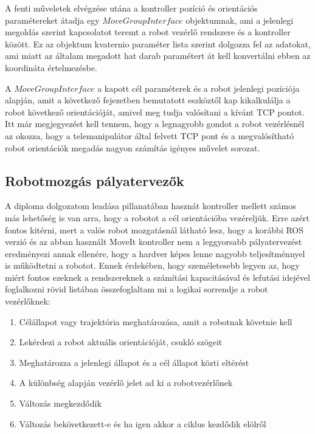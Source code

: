 A fenti műveletek elvégzése utána a kontroller pozíció és orientációs paramétereket átadja egy $MoveGroupInterface$ objektumnak, ami a jelenlegi megoldás szerint kapcsolatot teremt a robot vezérlő rendszere és a kontroller között. Ez az objektum kvaternio paraméter lista szerint dolgozza fel az adatokat, ami miatt az általam megadott hat darab paramétert át kell konvertálni ebben az koordináta értelmezésbe.\cite{ROSnoetic}\citep{moveit}

A $MoveGroupInterface$ a kapott cél paraméterek és a robot jelenlegi pozíciója alapján, amit a következő fejezetben bemutatott eszköztől kap kikalkulálja a robot következő orientációját, amivel meg tudja valósítani a kívánt TCP pontot. Itt már megjegyezést kell tennem, hogy a legnagyobb gondot a robot vezérlésnél az okozza, hogy a telemanipulátor által felvett TCP pont és a megvalósítható robot orientációk megadás nagyon számítás igényes művelet sorozat.\cite{ROSnoetic}\citep{moveit}

\subsection{Robotmozgás pályatervezők}

A diploma dolgozatom leadása pillanatában hasznát kontroller mellett számos más lehetőség is van arra, hogy a robotot a cél orientációba vezéreljük. Erre azért fontos kitérni, mert a valós robot mozgatásnál látható lesz, hogy a korábbi ROS verzió és az abban használt MoveIt kontroller nem a leggyorsabb pályatervezést eredményezi annak ellenére, hogy a hardver képes lenne nagyobb teljesítménnyel is működtetni a robotot. Ennek érdekében, hogy személetesebb legyen az, hogy miért fontos ezeknek a rendszereknek a számítási kapacitásával és lefutási idejével foglalkozni rövid listában összefoglaltam mi a logikai sorrendje a robot vezérlőknek:\cite{ROSnoetic}\citep{moveit}

\begin{enumerate}
\item Célállapot vagy trajektória meghatározása, amit a robotnak követnie kell
\item Lekérdezi a robot aktuális orientációját, csukló szögeit
\item Meghatározza a jelenlegi állapot és a cél állapot közti eltérést
\item A különbség alapján vezérlő jelet ad ki a robotvezérlőnek
\item Változás megkezdődik
\item Változás bekövetkezett-e és ha igen akkor a ciklus kezdődik elölről
\end{enumerate}

